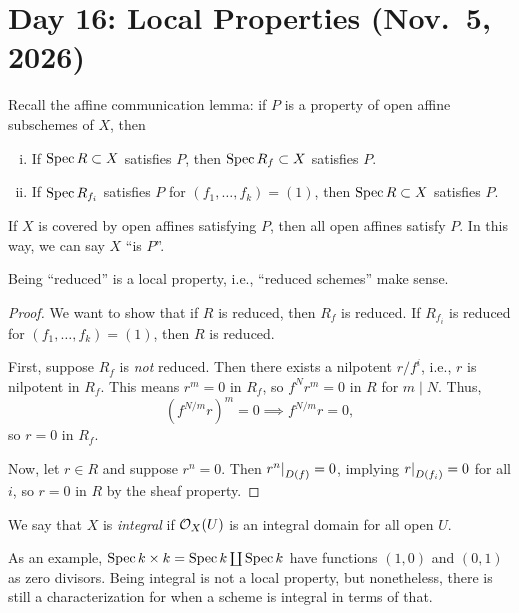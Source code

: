 \section{Day 16: Local Properties (Nov.\ 5, 2026)}
Recall the affine communication lemma: if $P$ is a property of open affine subschemes of $X$, then
\begin{enumerate}[(i)]
    \item If $\operatorname{Spec} R \subset X$ satisfies $P$, then $\operatorname{Spec} R_f \subset X$ satisfies $P$.
    \item If $\operatorname{Spec} R_{f_i}$ satisfies $P$ for $(f_1, \dots, f_k) = (1)$, then $\operatorname{Spec} R \subset X$ satisfies $P$.
\end{enumerate}
If $X$ is covered by open affines satisfying $P$, then all open affines satisfy $P$. In this way, we can say $X$ ``is $P$''.

\begin{theorem} \label{thm:reduced_is_local_property}
    Being ``reduced'' is a local property, i.e., ``reduced schemes'' make sense.
\end{theorem}
\begin{proof}
    We want to show that if $R$ is reduced, then $R_f$ is reduced. If $R_{f_i}$ is reduced for $(f_1, \dots, f_k) = (1)$, then $R$ is reduced.

    First, suppose $R_f$ is \textit{not} reduced. Then there exists a nilpotent $r/f^i$, i.e., $r$ is nilpotent in $R_f$. This means $r^m = 0$ in $R_f$, so $f^N r^m = 0$ in $R$ for $m \mid N$. Thus,
    \[ \left(f^{N/m} r\right)^m = 0 \implies f^{N/m} r = 0, \]
    so $r = 0$ in $R_f$.

    Now, let $r \in R$ and suppose $r^n = 0$. Then $\restr{r^n}{D(f)} = 0$, implying $\restr{r}{D(f_i)} = 0$ for all $i$, so $r = 0$ in $R$ by the sheaf property.
\end{proof}

\begin{definition} \label{defn:integral_scheme}
    We say that $X$ is \textit{integral} if $\mathcal O_X(U)$ is an integral domain for all open $U$.
\end{definition}
As an example, $\operatorname{Spec} k \times k = \operatorname{Spec} k \coprod \operatorname{Spec} k$ have functions $(1, 0)$ and $(0, 1)$ as zero divisors. Being integral is not a local property, but nonetheless, there is still a characterization for when a scheme is integral in terms of that.

